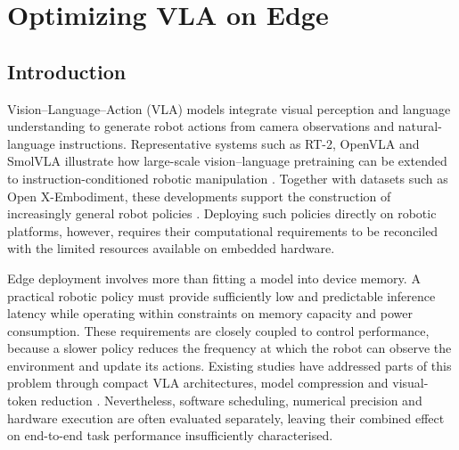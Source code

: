 %
%


\section{Optimizing VLA on Edge}

\subsection{Introduction}
Vision--Language--Action (VLA) models integrate visual perception and language understanding to generate robot actions from camera observations and natural-language instructions. Representative systems such as RT-2, OpenVLA and SmolVLA illustrate how large-scale vision--language pretraining can be extended to instruction-conditioned robotic manipulation \cite{rt2,openvla,smolvla}. Together with datasets such as Open X-Embodiment, these developments support the construction of increasingly general robot policies \cite{openx}. Deploying such policies directly on robotic platforms, however, requires their computational requirements to be reconciled with the limited resources available on embedded hardware.

Edge deployment involves more than fitting a model into device memory. A practical robotic policy must provide sufficiently low and predictable inference latency while operating within constraints on memory capacity and power consumption. These requirements are closely coupled to control performance, because a slower policy reduces the frequency at which the robot can observe the environment and update its actions. Existing studies have addressed parts of this problem through compact VLA architectures, model compression and visual-token reduction \cite{litevlaedge,nanovla,efficientvla}. Nevertheless, software scheduling, numerical precision and hardware execution are often evaluated separately, leaving their combined effect on end-to-end task performance insufficiently characterised.

